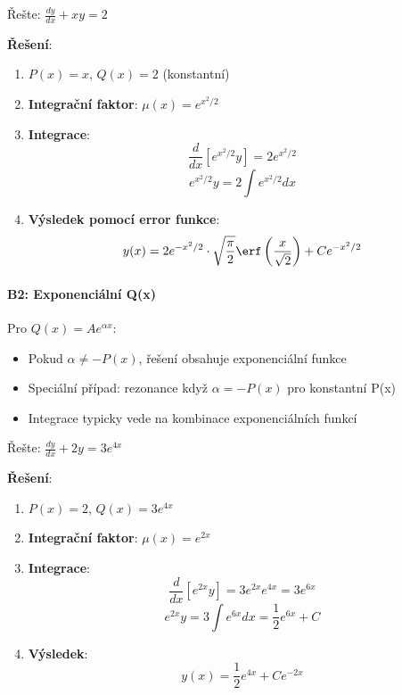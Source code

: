 \vspace{0.6\baselineskip}

\begin{example}[Konstantní Q(x)]
Řešte: $\frac{dy}{dx} + xy = 2$
\vspace{0.3\baselineskip}

\textbf{Řešení}: 
\begin{enumerate}
\item $P(x) = x$, $Q(x) = 2$ (konstantní)

\item \textbf{Integrační faktor}: $\mu(x) = e^{x^2/2}$

\item \textbf{Integrace}:
\[
\frac{d}{dx}[e^{x^2/2}y] = 2e^{x^2/2}
\]
\[
e^{x^2/2}y = 2\int e^{x^2/2}dx
\]

\item \textbf{Výsledek pomocí error funkce}:
\[
y(x) = 2e^{-x^2/2} \cdot \sqrt{\frac{\pi}{2}} \erf\left(\frac{x}{\sqrt{2}}\right) + Ce^{-x^2/2}
\]
\end{enumerate}
\end{example}

\vspace{0.6\baselineskip}

\paragraph*{B2: Exponenciální Q(x)}

\begin{remark}
Pro $Q(x) = Ae^{\alpha x}$:
\begin{itemize}
\item Pokud $\alpha \neq -P(x)$, řešení obsahuje exponenciální funkce
\item Speciální případ: rezonance když $\alpha = -P(x)$ pro konstantní P(x)
\item Integrace typicky vede na kombinace exponenciálních funkcí
\end{itemize}
\end{remark}

\vspace{0.6\baselineskip}

\begin{example}
Řešte: $\frac{dy}{dx} + 2y = 3e^{4x}$
\vspace{0.3\baselineskip}

\textbf{Řešení}: 
\begin{enumerate}
\item $P(x) = 2$, $Q(x) = 3e^{4x}$

\item \textbf{Integrační faktor}: $\mu(x) = e^{2x}$

\item \textbf{Integrace}:
\[
\frac{d}{dx}[e^{2x}y] = 3e^{2x}e^{4x} = 3e^{6x}
\]
\[
e^{2x}y = 3\int e^{6x}dx = \frac{1}{2}e^{6x} + C
\]

\item \textbf{Výsledek}:
\[
y(x) = \frac{1}{2}e^{4x} + Ce^{-2x}
\]
\end{enumerate}
\end{example}

